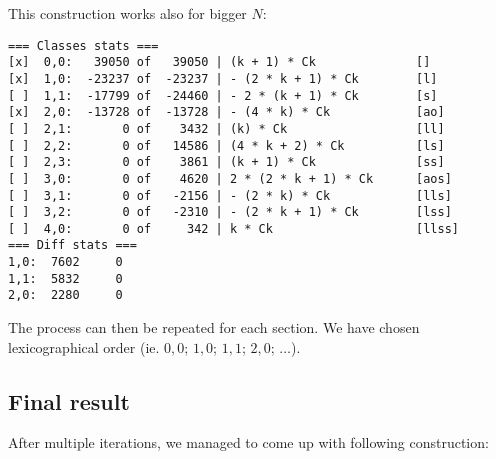 \documentclass[final]{article}
\theoremstyle{definition}
\theoremstyle{remark}
\begin{document}
This construction works also for bigger \(N\):

\begin{lstlisting}
=== Classes stats ===
[x]  0,0:   39050 of   39050 | (k + 1) * Ck              []
[x]  1,0:  -23237 of  -23237 | - (2 * k + 1) * Ck        [l]
[ ]  1,1:  -17799 of  -24460 | - 2 * (k + 1) * Ck        [s]
[x]  2,0:  -13728 of  -13728 | - (4 * k) * Ck            [ao]
[ ]  2,1:       0 of    3432 | (k) * Ck                  [ll]
[ ]  2,2:       0 of   14586 | (4 * k + 2) * Ck          [ls]
[ ]  2,3:       0 of    3861 | (k + 1) * Ck              [ss]
[ ]  3,0:       0 of    4620 | 2 * (2 * k + 1) * Ck      [aos]
[ ]  3,1:       0 of   -2156 | - (2 * k) * Ck            [lls]
[ ]  3,2:       0 of   -2310 | - (2 * k + 1) * Ck        [lss]
[ ]  4,0:       0 of     342 | k * Ck                    [llss]
=== Diff stats ===
1,0:  7602     0
1,1:  5832     0
2,0:  2280     0
\end{lstlisting}

The process can then be repeated for each section. We have chosen lexicographical order (ie. \(0,0\); \(1,0\); \(1,1\); \(2,0\); \(\ldots\)).

\subsection{Final result}%
\label{sub:final_result}

After multiple iterations, we managed to come up with following construction:
\end{document}
